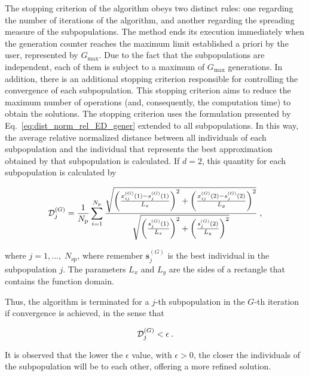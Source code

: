 \documentclass[smallextended]{svjour3}       %
\begin{document}
The stopping criterion of the algorithm obeys two distinct rules: one regarding the number of iterations of the algorithm, and another regarding the spreading measure of the subpopulations. The method ends its execution immediately when the generation counter reaches the maximum limit established a priori by the user, represented by $G_{\text{max}}$. Due to the fact that the subpopulations are independent, each of them is subject to a maximum of $ G_{\text{max}} $ generations. In addition, there is an additional stopping criterion responsible for controlling the convergence of each subpopulation. This stopping criterion aims to reduce the maximum number of operations (and, consequently, the computation time) to obtain the solutions. The stopping criterion uses the formulation presented by Eq.~\ref{eq:dist_norm_rel_ED_gener} extended to all subpopulations. In this way, the average relative normalized distance between all individuals of each subpopulation and the individual that represents the best approximation obtained by that subpopulation is calculated. If
 $d = 2$, this quantity for each subpopulation is calculated by
 
 \begin{equation} \label{eq:Dist_norm_relat_subpop}
{\cal{D}}_{j}^{(G)} = \frac{1}{N_{\text{p}}}  \sum_{i=1}^{N_{\text{p}}} \frac{{\sqrt{ \left( \frac{x_{i j} ^{(G)} (1) - s_{j} ^{(G)}(1)}{L_{x}} \right)^{2} + \left( \frac{x_{i j} ^{(G)} (2) - s_{j} ^{(G)} (2)}{L_{y}} \right)^{2} }}} {\sqrt{ \left( \frac{s_{j} ^{(G)} (1)}{L_{x}} \right)^{2} + \left( \frac{s_{j}^{(G)} (2)}{L_{y}} \right)^{2} }} \; ,
\end{equation}

\noindent where $ j = 1, \dots, \; N_{\text{sp}} $, where remember $\boldsymbol{s}_{j} ^{(G)}$ is the best individual in the subpopulation $j$. The parameters $L_{x}$ and $L_{y}$ are the sides of a rectangle that contains the function domain.

Thus, the algorithm is terminated for a $j$-th subpopulation in the $G$-th iteration if convergence is achieved, in the sense that

\begin{equation} \label{eq:dist_norm_rel_MDEITMF_epsilon}
{\cal{D}}_{j}^{\left(G\right)} < \epsilon \: .
\end{equation}

It is observed that the lower the $\epsilon$ value, with $\epsilon > 0$, the closer the individuals of the subpopulation will be to each other, offering a more refined solution.
\end{document}
